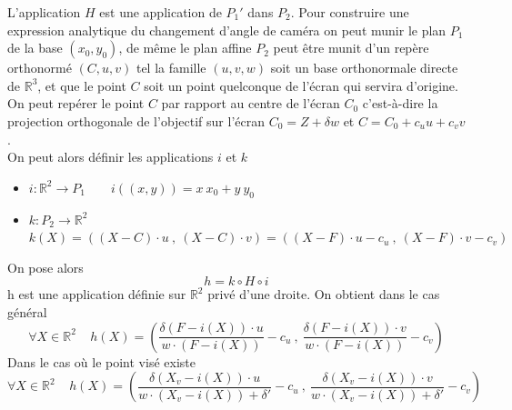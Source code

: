 L'application $H$ est une application de $P_{1}'$ dans $P_{2}$. Pour construire une expression analytique du changement d'angle de caméra on peut munir le plan $P_{1}$ de la base $(x_{0},y_{0})$, de même le plan affine $P_{2}$ peut être munit d'un repère orthonormé $(C,u,v)$ tel la famille $(u,v,w)$ soit un base orthonormale directe de $\mathbb{R}^{3}$, et que le point $C$ soit un point quelconque de l'écran qui servira d'origine.\\
On peut repérer le point $C$ par rapport au centre de l'écran $C_{0}$ c'est-à-dire la projection orthogonale de l'objectif sur l'écran $C_{0}=Z+\delta w$ et $C=C_{0}+c_{u}u+c_{v}v$.\\
On peut alors définir les applications $i$ et $k$
\begin{itemize}
\item $i:\mathbb{R}^{2}\rightarrow P_{1}$~~~~$i((x,y))=x~x_{0}+y~y_{0}$
\item $k:P_{2}\rightarrow \mathbb{R}^{2}$~~~~$k(X)= ((X-C)\cdot u~,~(X-C)\cdot v)=((X-F)\cdot u-c_{u}~,~ (X-F)\cdot v-c_{v})$
\end{itemize}
On pose alors 
\begin{equation*}
h=k\circ H \circ i
\end{equation*}
h est une application définie sur $\mathbb{R}^{2}$ privé d'une droite. On obtient dans le cas général
\begin{equation*}
\forall X\in \mathbb{R}^{2} ~~~~~h(X)=\left(\frac{\delta (F-i(X))\cdot u}{w \cdot (F-i(X))}-c_{u}~,~\frac{\delta (F-i(X))\cdot v}{w \cdot (F-i(X))} -c_{v} \right) 
\end{equation*} 
Dans le cas où le point visé existe
\begin{equation*}
\forall X\in \mathbb{R}^{2} ~~~~~h(X)=\left(\frac{\delta (X_{v}-i(X))\cdot u}{w \cdot (X_{v}-i(X))+\delta'}-c_{u}~,~\frac{\delta (X_{v}-i(X))\cdot v}{w \cdot (X_{v}-i(X))+\delta'} -c_{v} \right) 
\end{equation*}



